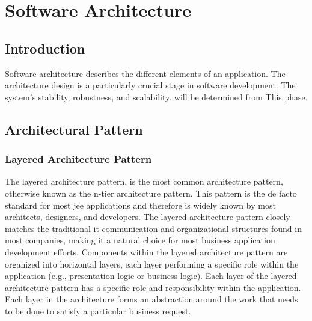 \documentclass[../main.tex]{subfiles}
\begin{document}
\chapter{Software Architecture}
\section{Introduction}
Software architecture describes the different elements of an application. The architecture design is a particularly crucial stage in software development. \newline The system's stability, robustness, and scalability. will be determined from This phase. \cite{ZULLIGHOVEN2005281}
\section{Architectural Pattern}
\subsection{Layered Architecture Pattern}
The layered architecture pattern, is the most common architecture pattern, otherwise known as the n-tier architecture pattern.
This pattern is the de facto standard for most \acrfull{jee} applications and therefore is widely known by most architects, designers, and developers. The layered architecture pattern closely matches the traditional \acrshort{it} communication and organizational structures found in most companies, making it a natural choice for most business application development efforts.\cite{SoftwareArchitecturePatterns}
\newline
Components within the layered architecture pattern are organized into horizontal layers, each layer performing a specific role within the application (e.g., presentation logic or business logic).
Each layer of the layered architecture pattern has a specific role and responsibility within the application. Each layer in the architecture forms an abstraction around the work that needs to be done to satisfy a particular business request.\cite{SoftwareArchitecturePatterns}
\end{document}
